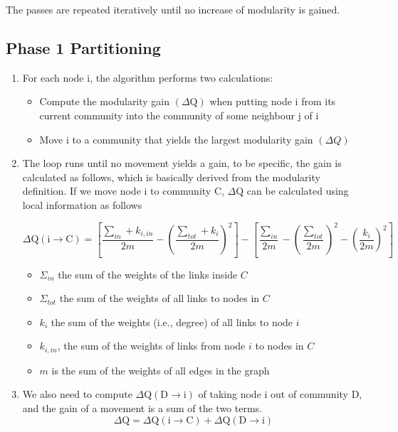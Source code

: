 The passes are repeated iteratively until no increase of modularity is gained.

\subsection{Phase 1 Partitioning}


\begin{enumerate}
    \item For each node i, the algorithm performs two calculations:
        \begin{itemize}
            \item Compute the modularity gain $(\Delta \mathrm{Q})$ when putting node i from its current
            community into the community of some neighbour j of i
            \item Move i to a community that yields the largest modularity gain $(\Delta Q)$
        \end{itemize}
    \item The loop runs until no movement yields a gain, to be specific, the gain is calculated as follows, which is basically derived from the modularity definition. If we move node i to community $\mathrm{C}$, $\Delta \mathrm{Q}$  can be calculated using local information as follows
    
    $$\Delta \mathrm{Q}(\mathrm{i} \rightarrow \mathrm{C})=\left[\frac{\sum_{i n}+k_{i, i n}}{2 m}-\left(\frac{\sum_{t o t}+k_{i}}{2 m}\right)^{2}\right]-\left[\frac{\sum_{i n}}{2 m}-\left(\frac{\sum_{t o t}}{2 m}\right)^{2}-\left(\frac{k_{i}}{2 m}\right)^{2}\right]$$
    \begin{itemize}
        \item $\Sigma_{in}$ the sum of the weights of the links inside $C$
        \item $\Sigma_{tot}$ the sum of the weights of all links to nodes in $C$
        \item $k_i$ the sum of the weights (i.e., degree) of all links to node $i$
        \item $k_{i, i n}$, the sum of the weights of links from node $i$ to nodes in $C$
        \item $m$ is the sum of the weights of all edges in the graph
    \end{itemize}
    \item We also need to compute $\Delta \mathrm{Q}(\mathrm{D} \rightarrow \mathrm{i})$ of taking node i out of community D, and the gain of a movement is a sum of the two terms.
    $$
    \Delta \mathrm{Q}=\Delta \mathrm{Q}(\mathrm{i} \rightarrow \mathrm{C})+\Delta \mathrm{Q}(\mathrm{D} \rightarrow \mathrm{i})
    $$

    
\end{enumerate}

